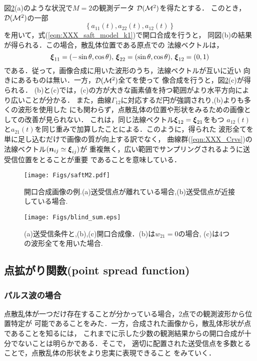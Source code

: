 図\ref{fig:XXX_blind_sum}(a)のような状況で$M=2$の観測データ
${\cal D}({\cal M}^2)$を得たとする．
このとき，${\cal D}({\cal M}^2)$の一部
\begin{equation}
	\left\{ 
		a_{11}(t), a_{22}(t), a_{12}(t) 
	\right\}
	\label{eqn:}
\end{equation}
を用いて，式(\ref{eqn:XXX_saft_model_k1})で開口合成を行うと，
同図(b)の結果が得られる．この場合，散乱体位置である原点での
法線ベクトルは，
\begin{equation}
	\mbox{\boldmath $\xi$}_{11}=(-\sin\theta,\cos\theta), \,
	\mbox{\boldmath $\xi$}_{22}=( \sin\theta,\cos\theta), \,
	\mbox{\boldmath $\xi$}_{12}=(0,1)
	\label{eqn:XXX_11}
\end{equation}
である．従って，画像合成に用いた波形のうち，法線ベクトルが互いに近い
向きにあるものは無い．一方，${\cal D}({\cal M}^2)$全てを使って
像合成を行うと，図\ref{fig:XXX_blind_sum}(c)が得られる．
(b)と(c)では，(c)の方が大きな画素値を持つ範囲がより水平方向により広いことが分かる．
また，曲線$\Gamma_{12}$に対応するだ円が強調されり,(b)よりも多くの波形を使用した
にも関わらず，点散乱体の位置や形状をみるための画像としての改善が見られない．
これは，同じ法線ベクトル$\mbox{\boldmath $\xi$}_{12}=\mbox{\boldmath $\xi$}_{21}$をもつ
$a_{12}(t)$と$a_{21}(t)$を同じ重みで加算したことによる．このように，得られた
波形全てを単に足し込むだけで画像の質が向上する訳でなく，
曲線群(\ref{eqn:XXX_Crvs})の法線ベクトル$(\mbox{\boldmath $n$}_{ij}\simeq \mbox{\boldmath $\xi$}_{ij})$が
重複無く，広い範囲でサンプリングされるように送受信位置をとることが重要
であることを意味している．
\begin{figure}[h]
	\begin{center}
	\texttt{[image: Figs/saftM2.pdf]} 
	\end{center}
	\caption{開口合成画像の例.(a)送受信点が離れている場合,(b)送受信点が近接している場合.} 
	\label{fig:XXX_saftM2}
\end{figure}
\begin{figure}[h]
	\begin{center}
	\texttt{[image: Figs/blind\_sum.eps]} 
	\end{center}
	\caption{(a)送受信条件と,(b),(c)開口合成像．(b)は$w_{21}=0$の場合, (c)は4つの波形全てを用いた場合.}
	\label{fig:XXX_blind_sum}
\end{figure}
\subsection{点拡がり関数(point spread function)}
\subsubsection{パルス波の場合}
点散乱体が一つだけ存在することが分かっている場合，2点での観測波形から位置特定が
可能であることをみた．一方，合成された画像から，散乱体形状が点であることを知るには，
これまでに示した少数の観測結果からの開口合成が十分でないことは明らかである．そこで，
適切に配置された送受信点を多数とることで，点散乱体の形状をより忠実に表現できること
をみていく．

